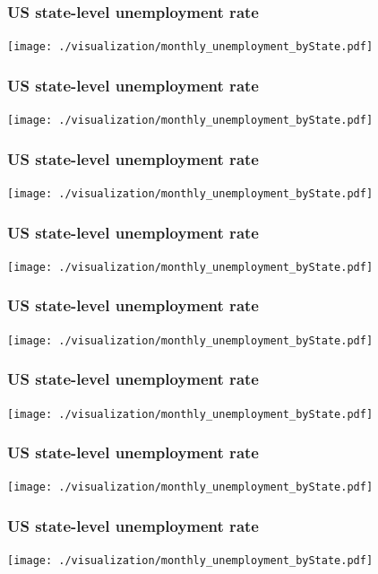 \documentclass{beamer} %
\newcommand{\1}{\mathbb{1}}
\begin{document}
{				\begin{frame}[t]\frametitle{US state-level unemployment rate}
				\texttt{[image: ./visualization/monthly\_unemployment\_byState.pdf]}
				\end{frame}

				\begin{frame}[t]\frametitle{US state-level unemployment rate}
				\texttt{[image: ./visualization/monthly\_unemployment\_byState.pdf]}
				\end{frame}

				\begin{frame}[t]\frametitle{US state-level unemployment rate}
				\texttt{[image: ./visualization/monthly\_unemployment\_byState.pdf]}
				\end{frame}

				\begin{frame}[t]\frametitle{US state-level unemployment rate}
				\texttt{[image: ./visualization/monthly\_unemployment\_byState.pdf]}
				\end{frame}

				\begin{frame}[t]\frametitle{US state-level unemployment rate}
				\texttt{[image: ./visualization/monthly\_unemployment\_byState.pdf]}
				\end{frame}

				\begin{frame}[t]\frametitle{US state-level unemployment rate}
				\texttt{[image: ./visualization/monthly\_unemployment\_byState.pdf]}
				\end{frame}

				\begin{frame}[t]\frametitle{US state-level unemployment rate}
				\texttt{[image: ./visualization/monthly\_unemployment\_byState.pdf]}
				\end{frame}



				\begin{frame}[t]\frametitle{US state-level unemployment rate}
				\texttt{[image: ./visualization/monthly\_unemployment\_byState.pdf]}
				\end{frame}

}
\end{document}
